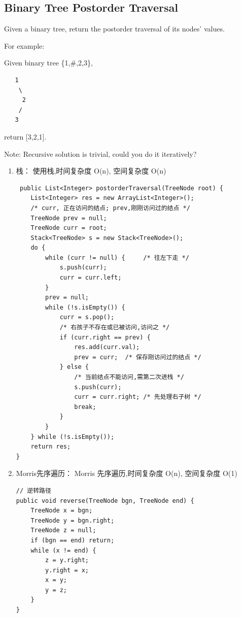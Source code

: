 \documentclass[12pt]{book}
\begin{document}
\subsection{Binary Tree Postorder Traversal}
\label{sec-4-2-3}
Given a binary tree, return the postorder traversal of its nodes' values.

For example:

Given binary tree \{1,\#,2,3\},
\lstset{language=java,label= ,caption= ,numbers=none}
\begin{lstlisting}
   1
    \
     2
    /
   3
\end{lstlisting}

return [3,2,1].

Note: Recursive solution is trivial, could you do it iteratively?
\begin{enumerate}
\item 栈： 使用栈,时间复杂度 O(n), 空间复杂度 O(n)
\label{sec-4-2-3-1}

\lstset{language=java,label= ,caption= ,numbers=none}
\begin{lstlisting}
 public List<Integer> postorderTraversal(TreeNode root) {
    List<Integer> res = new ArrayList<Integer>();
    /* curr, 正在访问的结点; prev,刚刚访问过的结点 */
    TreeNode prev = null; 
    TreeNode curr = root; 
    Stack<TreeNode> s = new Stack<TreeNode>();
    do {
        while (curr != null) {     /* 往左下走 */
            s.push(curr);
            curr = curr.left;
        }
        prev = null;
        while (!s.isEmpty()) {
            curr = s.pop();
            /* 右孩子不存在或已被访问,访问之 */
            if (curr.right == prev) {
                res.add(curr.val);
                prev = curr;  /* 保存刚访问过的结点 */
            } else {
                /* 当前结点不能访问,需第二次进栈 */
                s.push(curr);
                curr = curr.right; /* 先处理右子树 */
                break;
            }
        }
    } while (!s.isEmpty());
    return res;
}
\end{lstlisting}

\item Morris先序遍历： Morris 先序遍历,时间复杂度 O(n), 空间复杂度 O(1)
\label{sec-4-2-3-2}

\lstset{language=java,label= ,caption= ,numbers=none}
\begin{lstlisting}
// 逆转路径
public void reverse(TreeNode bgn, TreeNode end) {
    TreeNode x = bgn;
    TreeNode y = bgn.right;
    TreeNode z = null;
    if (bgn == end) return;
    while (x != end) {
        z = y.right;
        y.right = x;
        x = y;
        y = z;
    }
}


\end{lstlisting}
\end{enumerate}
\end{document}
